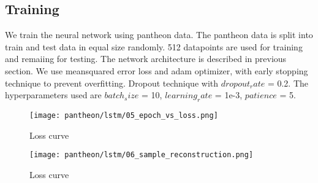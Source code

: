 \subsection{Training}
We train the neural network using pantheon data. The pantheon data is split into train and test data in equal size randomly. 512 datapoints are used for training and remaiing for testing. The network architecture is described in previous section. We use meansquared error loss and adam optimizer, with early stopping technique to prevent overfitting. Dropout technique with $dropout_rate$ = 0.2. The hyperparameters used are $batch_size$ = 10, $learning_rate$ = 1e-3, $patience$ = 5.
\begin{figure}[H]
	\centering
	\texttt{[image: pantheon/lstm/05\_epoch\_vs\_loss.png]}
	\caption{Loss curve}
	\label{fig:loss_curve}
\end{figure}
\begin{figure}[H]
	\centering
	\texttt{[image: pantheon/lstm/06\_sample\_reconstruction.png]}
	\caption{Loss curve}
	\label{fig:reconstruction}
\end{figure}